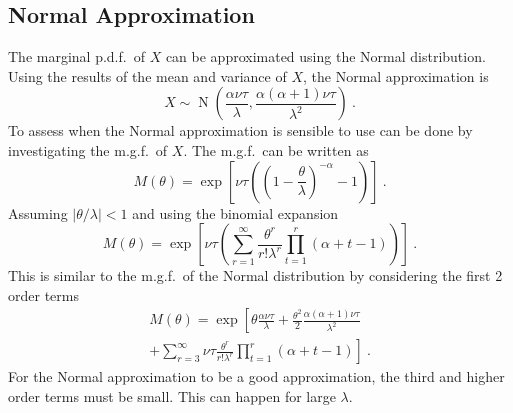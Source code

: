 \documentclass[a4paper]{proc}
\DeclareMathOperator{\normal}{N}
\begin{document}
\subsection{Normal Approximation}
The marginal p.d.f.~of $X$ can be approximated using the Normal distribution. Using the results of the mean and variance of $X$, the Normal approximation is
\begin{equation}
X\sim\normal\left(\frac{\alpha\nu\tau}{\lambda},\frac{\alpha(\alpha+1)\nu\tau}{\lambda^2}\right) \ .
\end{equation}
To assess when the Normal approximation is sensible to use can be done by investigating the m.g.f.~of $X$. The m.g.f.~can be written as
\begin{equation*}
M(\theta)=\exp\left[\nu\tau\left(\left(1-\frac{\theta}{\lambda}\right)^{-\alpha}-1\right)\right] \ .
\end{equation*}
Assuming $|\theta/\lambda|<1$ and using the binomial expansion
\begin{equation}
M(\theta)=\exp\left[\nu\tau\left(
\sum_{r=1}^{\infty}\frac{\theta^r}{r!\lambda^r}\prod_{t=1}^{r}(\alpha+t-1)
\right)\right] \ .
\end{equation}
This is similar to the m.g.f.~of the Normal distribution by considering the first 2 order terms
\begin{multline}
M(\theta)=\exp\left[\theta\frac{\alpha\nu\tau}{\lambda}+\frac{\theta^2}{2}\frac{\alpha(\alpha+1)\nu\tau}{\lambda^2}
\right.\\\left.
+\sum_{r=3}^\infty\nu\tau\frac{\theta^r}{r!\lambda^r}\prod_{t=1}^{r}(\alpha+t-1)
\right] \ .
\end{multline}
For the Normal approximation to be a good approximation, the third and higher order terms must be small. This can happen for large $\lambda$.
\end{document}

